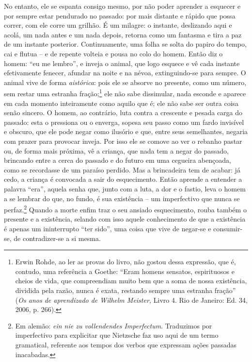 No entanto, ele se espanta consigo mesmo, por não poder aprender a
esquecer e por sempre estar pendurado no passado: por mais distante e
rápido que possa correr, com ele corre um grilhão. É um milagre: o
instante, deslizando aqui e acolá, um nada antes e um nada depois,
retorna como um fantasma e tira a paz de um instante posterior.
Continuamente, uma folha se solta do papiro do tempo, cai e flutua -- e
de repente volteia e pousa no colo do homem. Então diz o homem: ``eu me
lembro'', e inveja o animal, que logo esquece e vê cada instante
efetivamente fenecer, afundar na noite e na névoa, extinguindo-se para
sempre. O animal vive de forma \emph{aistórica}: pois ele se absorve no
presente, como um número, sem restar uma estranha fração;\footnote{Erwin
  Rohde, ao ler as provas do livro, não gostou dessa expressão, que é,
  contudo, uma referência a Goethe: ``Eram homens sensatos, espirituosos
  e cheios de vida, que compreendiam muito bem que a soma de nossa
  existência, dividida pela razão, nunca é exata, restando sempre uma
  estranha fração'' (\emph{Os anos de aprendizado de Wilhelm Meister,}
  Livro 4. Rio de Janeiro: Ed. 34, 2006, p. 266).} ele não sabe
dissimular, nada esconde e aparece em cada momento inteiramente como
aquilo que é; ele não sabe ser outra coisa senão sincero. O homem, ao
contrário, luta contra a crescente e pesada carga do passado: esta o
pressiona ou o enverga, sopesa seu passo como um fardo invisível e
obscuro, que ele pode negar como ilusório e que, entre seus semelhantes,
negaria com prazer para provocar inveja. Por isso ele se comove ao ver
o rebanho pastar ou, de forma mais próxima, vê a criança, que nada tem a
negar do passado, brincando entre a cerca do passado e do futuro em uma
cegueira abençoada, como se recordasse de um paraíso perdido. Mas a
brincadeira tem de acabar: já cedo, a criança é convocada a sair do
esquecimento. Então aprende a entender a palavra ``era'', aquela senha
que, junto com a luta, a dor e o fastio, leva o homem a se lembrar do
que, no fundo, é sua existência -- um imperfectivo que nunca se
perfaz.\footnote{Em alemão: \emph{ein nie zu vollendendes Imperfectum}.
  Traduzimos por imperfectivo para explicitar que Nietzsche faz uso aqui
  de um termo gramatical, referente aos tempos dos verbos que expressam
  ações passadas inacabadas.} Quando a morte enfim traz o seu ansiado
esquecimento, rouba também o presente e a existência, selando com
isso aquele conhecimento de que a existência é apenas um ininterrupto
``ter sido'', uma coisa que vive de negar-se e consumir-se, de
contradizer-se a si mesma.

